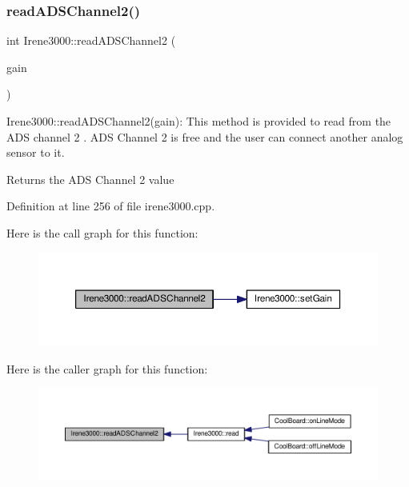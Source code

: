 \subsubsection{\texorpdfstring{read\+A\+D\+S\+Channel2()}{readADSChannel2()}}
{\footnotesize\ttfamily int Irene3000\+::read\+A\+D\+S\+Channel2 (\begin{DoxyParamCaption}\item[{ads\+Gain\+\_\+t}]{gain }\end{DoxyParamCaption})}

Irene3000\+::read\+A\+D\+S\+Channel2(gain)\+: This method is provided to read from the A\+DS channel 2 . A\+DS Channel 2 is free and the user can connect another analog sensor to it.

\begin{DoxyReturn}{Returns}
the A\+DS Channel 2 value 
\end{DoxyReturn}


Definition at line 256 of file irene3000.\+cpp.

Here is the call graph for this function\+:
\nopagebreak
\begin{figure}[H]
\begin{center}
\leavevmode
\includegraphics[width=350pt]{d6/d03/class_irene3000_ae73bd2ed14a199a7e83f4d6458476a7c_cgraph}
\end{center}
\end{figure}
Here is the caller graph for this function\+:
\nopagebreak
\begin{figure}[H]
\begin{center}
\leavevmode
\includegraphics[width=350pt]{d6/d03/class_irene3000_ae73bd2ed14a199a7e83f4d6458476a7c_icgraph}
\end{center}
\end{figure}
\mbox{\label{class_irene3000_ae0e0a5b773c3625b44c1d113c76a1540}} 
